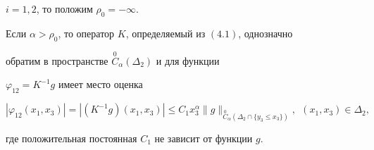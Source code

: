 $i=1,2$, то положим $\rho_0 = -\infty$.





\begin{lem}


Если $\alpha > \rho_0$, то оператор $K$, определяемый из $(4.1)$, однозначно


обратим в пространстве $\overset{0}{C}_{\alpha}(\Delta_2)$ и для функции


$\varphi_{12}=K^{-1}g$ имеет место оценка




\begin{equation}


|\varphi_{12}(x_1,x_3)|=|(K^{-1}g)(x_1,x_3)| \leq C_1 x_3^{\alpha}


\|g\|_{\overset{0}{C}_{\alpha}(\Delta_2 \cap \{y_3 \leq x_3\})},\ \ (x_1,


x_3) \in \Delta_2,


\end{equation}


где положительная постоянная $C_1$ не зависит от функции $g$.


\end{lem}





